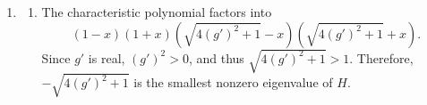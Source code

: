 \documentclass[11pt, letterpaper]{article}
\begin{document}
\begin{enumerate}
\[\begin{pmatrix}
	1 &  &  &  \\
	 & 1 &  & 
	\end{pmatrix} \right)
\]
\[
	=-\frac{\hbar^2 J}{2} \begin{pmatrix}
	1 &  &  &  \\
	 & -1 &  &  \\
	 &  & -1 &  \\
	 &  &  & 1
	\end{pmatrix}+\frac{\hbar g}{2} \begin{pmatrix}
	 & 1 & 1 &  \\
	1 &  &  & 1 \\
	1 &  &  & 1 \\
	 & 1 & 1 & 
	\end{pmatrix}
.\]
We can verify that this is correct by noticing that we are representing our basis states using the Kronecker product, so we can represent the dual space in the same way and immediately compute that
\[
	H=-2J\frac{\hbar^2}{4}\begin{pmatrix}
	S_z &  \\
	 & -S_z
	\end{pmatrix}+\frac{\hbar g}{2} \begin{pmatrix}
	 & \mathbbm{1} \\
	\mathbbm{1} & 
	\end{pmatrix}+\frac{\hbar g}{2} \begin{pmatrix}
	\sigma_x &  \\
	 & \sigma_x
	\end{pmatrix} 
\]
\[
	=-\frac{\hbar^2 J}{2} \begin{pmatrix}
	1 &  &  &  \\
	 & -1 &  &  \\
	 &  & -1 &  \\
	 &  &  & 1
	\end{pmatrix}+\frac{\hbar g}{2} \begin{pmatrix}
	 & 1 & 1 &  \\
	1 &  &  & 1 \\
	1 &  &  & 1 \\
	 & 1 & 1 & 
	\end{pmatrix}
.\]
This is exactly what we obtained in our calculations.
\item 
	\begin{enumerate}
		\item The characteristic polynomial factors into
			\[
				(1-x)(1+x)\left( \sqrt{4(g')^2+1} -x \right) \left( \sqrt{4(g')^2+1} +x \right) 
			.\]
			Since $g'$ is real, $(g')^2>0$, and thus $\sqrt{4(g')^2+1} >1$. Therefore,  $-\sqrt{4(g')^2+1} $ is the smallest nonzero eigenvalue of $H$.


\end{enumerate}
\end{enumerate}
\end{document}
